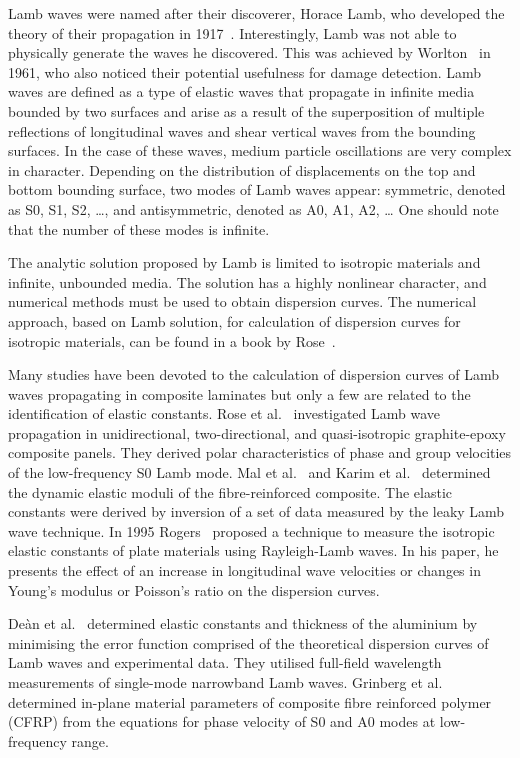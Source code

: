 \documentclass[preprint,12pt]{elsarticle}
\begin{document}
	Lamb waves were named after their discoverer, Horace Lamb, who developed the theory of their propagation in 1917~\cite{Lamb1917}. Interestingly, Lamb was not able to physically generate the waves he discovered. This was achieved by Worlton~\cite{Worlton1961} in 1961, who also noticed their potential usefulness for damage detection. Lamb waves are defined as a type of elastic waves that propagate in infinite media bounded by two surfaces and arise as a result of the superposition of multiple reflections of longitudinal waves and shear vertical waves from the bounding surfaces. In the case of these waves, medium particle oscillations are very complex in character. Depending on the distribution of displacements on the top and bottom bounding surface, two modes of Lamb waves appear: symmetric, denoted as S0, S1, S2, …, and antisymmetric, denoted as A0, A1, A2, … One should note that the number of these modes is infinite.
	
	The analytic solution proposed by Lamb is limited to isotropic materials and infinite, unbounded media. The solution has a highly nonlinear character, and numerical methods must be used to obtain dispersion curves. The numerical approach, based on Lamb solution, for calculation of dispersion curves for isotropic materials, can be found in a book by Rose~\cite{Rose1999}.
	
	Many studies have been devoted to the calculation of dispersion curves of Lamb waves propagating in composite laminates but only a few are related to the identification of elastic constants. Rose et al.~\cite{Rose1987} investigated Lamb wave propagation in unidirectional, two-directional, and quasi-isotropic graphite-epoxy composite panels. They derived polar characteristics of phase and group velocities of the low-frequency S0 Lamb mode. Mal et al.~\cite{Mal1993} and Karim et al.~\cite{Karim1990} determined the dynamic elastic moduli of the fibre-reinforced composite. The elastic constants were derived by inversion of a set of data measured by the leaky Lamb wave technique. In 1995 Rogers~\cite{Rogers1995} proposed a technique to measure the isotropic elastic constants of plate materials using Rayleigh-Lamb waves. In his paper, he presents the effect of an increase in longitudinal wave velocities or changes in Young’s modulus or Poisson’s ratio on the dispersion curves.
	
	De\`an et al.~\cite{Dean2008} determined elastic constants and thickness of the aluminium by minimising the error function comprised of the theoretical dispersion curves of Lamb waves and experimental data. They utilised full-field wavelength measurements of single-mode narrowband Lamb waves. Grinberg et al.~\cite{Grimberg2010} determined in-plane material parameters of composite fibre reinforced polymer (CFRP) from the equations for phase velocity of S0 and A0 modes at low-frequency range. 
	
\end{document}
